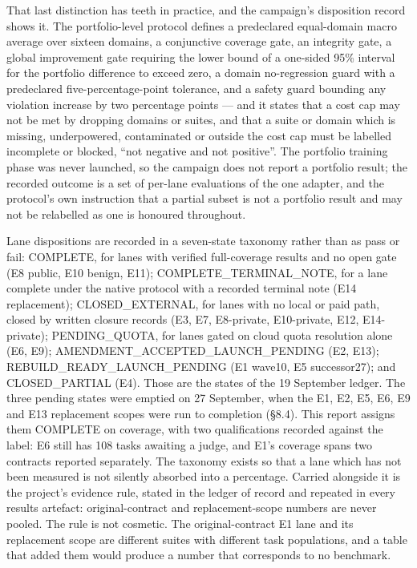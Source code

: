 \documentclass[12pt,a4paper]{report}
\begin{document}
That last distinction has teeth in practice, and the campaign's
disposition record shows it. The portfolio-level protocol defines a
predeclared equal-domain macro average over sixteen domains, a
conjunctive coverage gate, an integrity gate, a global improvement gate
requiring the lower bound of a one-sided 95\% interval for the portfolio
difference to exceed zero, a domain no-regression guard with a
predeclared five-percentage-point tolerance, and a safety guard bounding
any violation increase by two percentage points --- and it states that a
cost cap may not be met by dropping domains or suites, and that a suite
or domain which is missing, underpowered, contaminated or outside the
cost cap must be labelled incomplete or blocked, ``not negative and not
positive''. The portfolio training phase was never launched, so the
campaign does not report a portfolio result; the recorded outcome is a
set of per-lane evaluations of the one adapter, and the protocol's own
instruction that a partial subset is not a portfolio result and may not
be relabelled as one is honoured throughout.

Lane dispositions are recorded in a seven-state taxonomy rather than as
pass or fail: COMPLETE, for lanes with verified full-coverage results
and no open gate (E8 public, E10 benign, E11); COMPLETE\_\allowbreak{}TERMINAL\_\allowbreak{}NOTE,
for a lane complete under the native protocol with a recorded terminal
note (E14 replacement); CLOSED\_EXTERNAL, for lanes with no local or
paid path, closed by written closure records (E3, E7, E8-private,
E10-private, E12, E14-private); PENDING\_QUOTA, for lanes gated on cloud
quota resolution alone (E6, E9); AMENDMENT\_\allowbreak{}ACCEPTED\_\allowbreak{}LAUNCH\_\allowbreak{}PENDING
(E2, E13); REBUILD\_\allowbreak{}READY\_\allowbreak{}LAUNCH\_\allowbreak{}PENDING (E1 wave10, E5 successor27);
and CLOSED\_PARTIAL (E4). Those are the states of the 19 September
ledger. The three pending states were emptied on 27 September, when the
E1, E2, E5, E6, E9 and E13 replacement scopes were run to completion
(§8.4). This report assigns them COMPLETE on coverage, with two
qualifications recorded against the label: E6 still has 108 tasks
awaiting a judge, and E1's coverage spans two contracts reported
separately. The taxonomy exists so that a lane which has not been
measured is not silently absorbed into a percentage. Carried alongside
it is the project's evidence rule, stated in the ledger of record and
repeated in every results artefact: original-contract and
replacement-scope numbers are never pooled. The rule is not cosmetic.
The original-contract E1 lane and its replacement scope are different
suites with different task populations, and a table that added them
would produce a number that corresponds to no benchmark.
\end{document}
